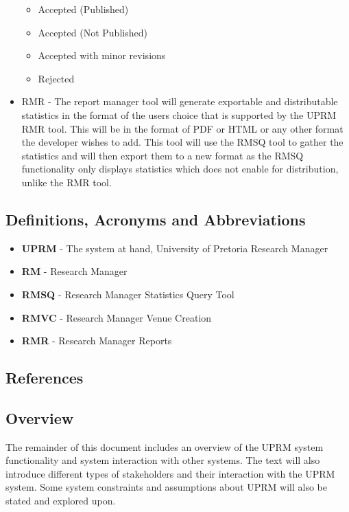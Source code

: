 \begin{paragraph}{}
\begin{itemize}
						\begin{itemize}
							\item Accepted (Published)
							\item Accepted (Not Published)
							\item Accepted with minor revisions
							\item Rejected
						\end{itemize}
					\item RMR -
						The report manager tool will generate exportable and distributable statistics in the format of the users choice that is supported by the UPRM RMR tool. This will be in the format of PDF or HTML or any other format the developer wishes to add. This tool will use the RMSQ tool to gather the statistics and will then export them to a new format as the RMSQ functionality only displays statistics which does not enable for distribution, unlike the RMR tool.
				\end{itemize}
		\end{paragraph}

	\subsection{Definitions, Acronyms and Abbreviations}
		\begin{itemize}
			\item{\textbf{UPRM}} - The system at hand, University of Pretoria Research Manager
			\item{\textbf{RM}} - Research Manager 
			\item{\textbf{RMSQ}} - Research Manager Statistics Query Tool
			\item{\textbf{RMVC}} - Research Manager Venue Creation
			\item{\textbf{RMR}} - Research Manager Reports
		\end{itemize}
	\subsection{References}
		

	\subsection{Overview}
	The remainder of this document includes an overview of the UPRM system functionality and system interaction with other systems. The text will also introduce different types of stakeholders and their interaction with the UPRM system. Some system constraints and assumptions about UPRM will also be stated and explored upon.